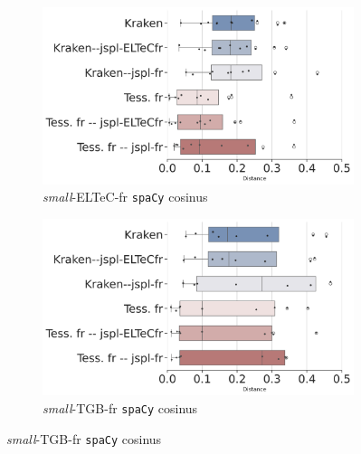 \begin{figure}[h!]

    \begin{subfigure}{0.45\textwidth}
  \includegraphics[height=.58\textwidth]{IMAGES/Boite-a_moustache_12072024/ELTeC_fra_spaCy3.5.1/ELTeC_fra_spaCy3.5.1-lg-cosinus-sim2-3.png} 
        \caption{\textit{small}-ELTeC-fr \texttt{spaCy} cosinus}
        \label{fig:ELTeC-Fra_spaCy-cosinus}
   \end{subfigure}
        \begin{subfigure}{0.45\textwidth}
  \includegraphics[height=.58\textwidth]{IMAGES/Boite-a_moustache_12072024/TGB_spaCy3.5.1/DATA_TGB-2023_spaCy3.5.1_Distance-lg-cosinus-sim2-3.png} 
        \caption{\textit{small}-TGB-fr \texttt{spaCy} cosinus}
                \label{fig:TGB_spaCy-cosinus}
   \end{subfigure}
   

\end{figure}
